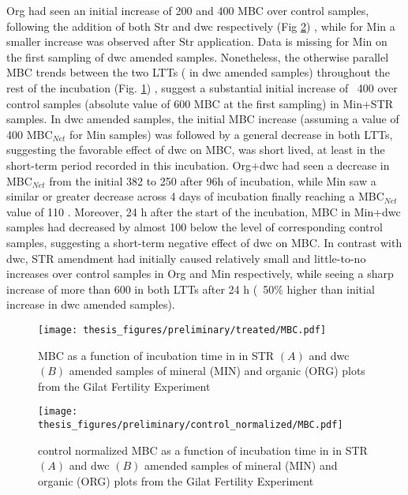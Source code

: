\documentclass[12pt]{report}
\begin{document}
		\noindent Org had seen an initial increase of 200 and 400 \genericunit MBC over control samples, following the addition of both Str and \gls{dwc} respectively (Fig \ref{fig:nor_mbc_treated_preliminary}) , while for Min a smaller increase was observed after Str application. Data is missing for Min on the first sampling of \gls{dwc}  amended samples. Nonetheless, the otherwise parallel MBC trends between the two LTTs ( in \gls{dwc} amended samples) throughout the rest of the incubation (Fig. \ref{fig:mbc_treated_preliminary}) , suggest a substantial initial increase of ~400 \genericunit over control samples (absolute value of 600 \genericunit MBC at the first sampling)  in Min+STR samples.
		In \gls{dwc} amended samples, the initial MBC increase (assuming a value of 400 \genericunit MBC$_{Net}$ for Min samples) was followed by a general decrease in both LTTs, suggesting the favorable effect of \gls{dwc} on MBC,  was short lived, at least in the short-term period recorded in this incubation. Org+\gls{dwc} had seen a decrease in MBC$_{Net}$ from the initial 382 to 250 \genericunit after 96h of incubation, while Min saw a similar or greater decrease across 4 days of incubation finally reaching a MBC$_{Net}$ value of  110 \genericunit. Moreover, 24 h after the start of the incubation, MBC in Min+\gls{dwc} samples had decreased by almost 100 \genericunit below the level of corresponding control samples,  suggesting a short-term negative effect of \gls{dwc} on MBC. In contrast with \gls{dwc}, STR amendment had initially caused relatively small and little-to-no increases over control samples in Org and Min respectively, while seeing a sharp increase of more than 600 \genericunit in both LTTs after 24 h (~50$\%$ higher than initial increase in \gls{dwc} amended samples).\\
		
		\begin{figure}[H]
			\centering
			\texttt{[image: thesis\_figures/preliminary/treated/MBC.pdf]}
			\caption{MBC  as a function of incubation time in in STR $\left(A\right)$ and \gls{dwc} $\left(B\right)$ amended samples of mineral (MIN) and organic (ORG) plots from the Gilat Fertility Experiment}
			\label{fig:mbc_treated_preliminary}
		\end{figure}
		
		\begin{figure}[H]
			\centering
			\texttt{[image: thesis\_figures/preliminary/control\_normalized/MBC.pdf]}
			\caption{control normalized MBC  as a function of incubation time in in STR $\left(A\right)$ and \gls{dwc} $\left(B\right)$ amended samples of mineral (MIN) and organic (ORG) plots from the Gilat Fertility Experiment}
			\label{fig:nor_mbc_treated_preliminary}
		\end{figure}
		
\end{document}
